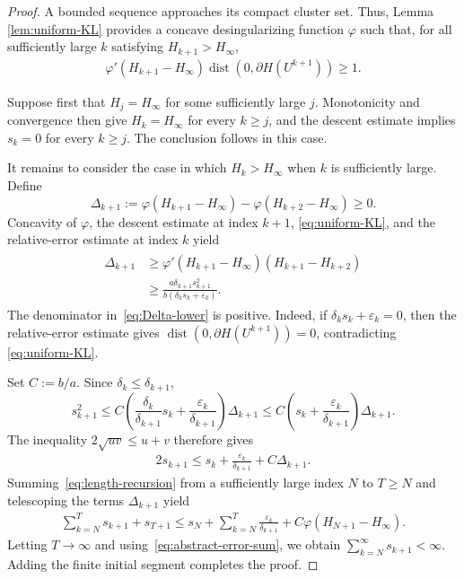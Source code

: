 \documentclass[9pt]{article}
\numberwithin{equation}{section}
\theoremstyle{definition}
\theoremstyle{remark}
\DeclareMathOperator{\dist}{dist}
\begin{document}
\begin{proof}
A bounded sequence approaches its compact cluster set. Thus, Lemma \ref{lem:uniform-KL} provides a  concave desingularizing function \(\varphi\) such that, for all sufficiently large \(k\) satisfying
$H_{k+1}>H_\infty$,
\begin{eqnarray}\label{eq:uniform-KL}
 \varphi'(H_{k+1}-H_\infty)
 \dist\!\left(0,\partial H(U^{k+1})\right)\geq1.
\end{eqnarray}

Suppose first that $H_j=H_\infty$ for some sufficiently large $j$.
Monotonicity and convergence then give
$H_k=H_\infty$ for every $k\geq j$, and the descent estimate implies
$s_k=0$ for every $k\geq j$. The conclusion follows in this case.

It remains to consider the case in which $H_k>H_\infty$ when $k$ is sufficiently large. Define
\[
 \Delta_{k+1}:=
 \varphi(H_{k+1}-H_\infty)
 -\varphi(H_{k+2}-H_\infty)\geq0.
\]
Concavity of $\varphi$, the descent estimate at index $k+1$,
\eqref{eq:uniform-KL}, and the relative-error estimate at index $k$
yield
\begin{eqnarray}\label{eq:Delta-lower}
\begin{aligned}
 \Delta_{k+1}
 &\geq\varphi'(H_{k+1}-H_\infty)(H_{k+1}-H_{k+2})\\
 &\geq\frac{a\delta_{k+1}s_{k+1}^2}
 {b(\delta_ks_k+\varepsilon_k)}.
\end{aligned}
\end{eqnarray}
The denominator in~\eqref{eq:Delta-lower} is positive. Indeed, if
$\delta_ks_k+\varepsilon_k=0$, then the relative-error estimate gives
$\dist(0,\partial H(U^{k+1}))=0$, contradicting
\eqref{eq:uniform-KL}.

Set $C:=b/a$. Since $\delta_k\leq\delta_{k+1}$,
$$
 s_{k+1}^2
 \leq C\left(
 \frac{\delta_k}{\delta_{k+1}}s_k
 +\frac{\varepsilon_k}{\delta_{k+1}}\right)\Delta_{k+1}
 \leq C\left(s_k+\frac{\varepsilon_k}{\delta_{k+1}}\right)
 \Delta_{k+1}.$$
The inequality $2\sqrt{uv}\leq u+v$ therefore gives
\begin{eqnarray}\label{eq:length-recursion}
 2s_{k+1}\leq s_k+\frac{\varepsilon_k}{\delta_{k+1}}
 +C\Delta_{k+1}.
\end{eqnarray}
Summing~\eqref{eq:length-recursion} from a sufficiently large index
$N$ to $T\geq N$ and telescoping the terms $\Delta_{k+1}$ yield
\begin{eqnarray*}
 \sum_{k=N}^{T}s_{k+1}+s_{T+1}
 \leq s_N+\sum_{k=N}^{T}\frac{\varepsilon_k}{\delta_{k+1}}
 +C\varphi(H_{N+1}-H_\infty).
\end{eqnarray*}
Letting $T\to\infty$ and using~\eqref{eq:abstract-error-sum}, we obtain
$\sum_{k=N}^{\infty}s_{k+1}<\infty$. Adding the finite initial
segment completes the proof.
\end{proof}
\end{document}
